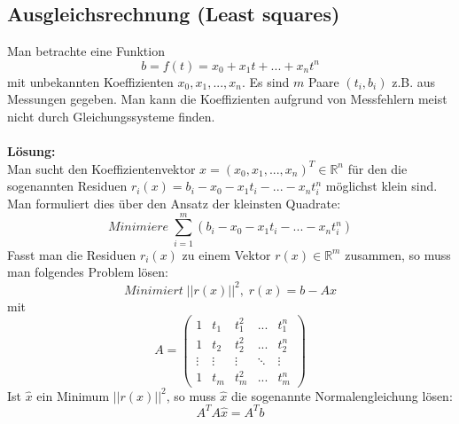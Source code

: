 \documentclass[a4paper,twocolumn,10pt]{article}
\begin{document}
\subsection{Ausgleichsrechnung (Least squares)}
Man betrachte eine Funktion
\begin{equation*}
b=f(t)=x_0+x_1t+...+x_nt^n
\end{equation*}
mit unbekannten Koeffizienten $x_0,x_1,...,x_n$. Es sind $m$ Paare $(t_i,b_i)$ z.B. aus Messungen gegeben. Man kann die Koeffizienten aufgrund von Messfehlern meist nicht durch Gleichungssysteme finden.\\\\
\textbf{Lösung:}\\
Man sucht den Koeffizientenvektor $x=(x_0,x_1,...,x_n)^T\in\mathbb{R}^n$ für den die sogenannten Residuen $r_i(x)=b_i-x_0-x_1t_i-...-x_nt_i^n$ möglichst klein sind. Man formuliert dies über den Ansatz der kleinsten Quadrate:
\begin{equation*}
Minimiere\;\sum\limits_{i=1}^{m}(b_i-x_0-x_1t_i-...-x_nt_i^n)
\end{equation*}
Fasst man die Residuen $r_i(x)$ zu einem Vektor $r(x)\in\mathbb{R}^m$ zusammen, so muss man folgendes Problem lösen:
\begin{equation*}
Minimiert\;||r(x)||^2,\;r(x)=b-Ax
\end{equation*}
mit
\begin{equation*}
A=\begin{pmatrix}1 & t_1 & t_1^2 & ... & t_1^n \\ 1 & t_2 & t_2^2 & ... & t_2^n \\ \vdots & \vdots & \vdots & \ddots & \vdots \\ 1 & t_m & t_m^2 & ... & t_m^n\end{pmatrix}
\end{equation*}
Ist $\hat{x}$ ein Minimum $||r(x)||^2$, so muss $\hat{x}$ die sogenannte Normalengleichung lösen:
\begin{equation*}
A^TA\hat{x}=A^Tb
\end{equation*}
\end{document}
